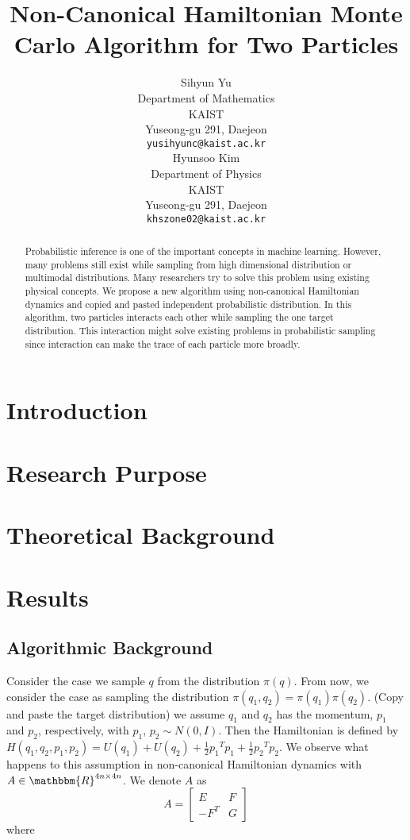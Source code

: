 \documentclass{article}
\title{Non-Canonical Hamiltonian Monte Carlo Algorithm for Two Particles}
\author{%
  Sihyun Yu\\
  Department of Mathematics\\
  KAIST\\
  Yuseong-gu 291, Daejeon \\
  \texttt{yusihyunc@kaist.ac.kr} \\
  \And
  Hyunsoo Kim\\
  Department of Physics\\
  KAIST\\
  Yuseong-gu 291, Daejeon \\
  \texttt{khszone02@kaist.ac.kr} \\
  }
\begin{document}

\maketitle

\begin{abstract}
Probabilistic inference is one of the important concepts in machine learning. However, many problems still exist while sampling from high dimensional distribution or multimodal distributions. Many researchers try to solve this problem using existing physical concepts. We propose a new algorithm using non-canonical Hamiltonian dynamics and copied and pasted independent probabilistic distribution.  In this algorithm, two particles interacts each other while sampling the one target distribution. This interaction might solve existing problems in probabilistic sampling since interaction can make the trace of each particle more broadly.   
 \end{abstract}
\section{Introduction}
\section{Research Purpose}
\section{Theoretical Background}
\section{Results}

\subsection{Algorithmic Background}

Consider the case we sample $q$ from the distribution $\pi(q)$. From now, we consider the case as sampling the distribution $\pi(q_1 , q_2 ) = \pi(q_1)\pi (q_2)$. (Copy and paste the target distribution) we assume $q_1$ and $q_2$ has the momentum, $p_1$ and $p_2$, respectively, with $p_1$, $p_2 \sim N(0,I)$. Then the Hamiltonian is defined by $\displaystyle H(q_1, q_2, p_1, p_2)  = U(q_1) +U(q_2)+\frac{1}{2}{p_1}^T p_1 + \frac{1}{2}{p_2}^T p_2$. We observe what happens to this assumption in non-canonical Hamiltonian dynamics with $A \in \mathbbm{R}^{4n \times 4n} $. We denote $A$ as
\[
A=
\left[
\begin{array}{c|c}
E & F \\
\hline
-F^{T} & G
\end{array}
\right]
\] where
\end{document}
